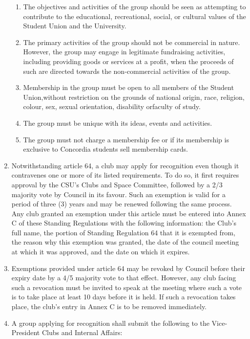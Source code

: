 \documentclass[oneside]{book}
\begin{document}
\begin{enumerate}
\begin{enumerate}
\item The objectives and activities of the group should be seen as attempting
to contribute to the educational, recreational, social, or cultural
values of the Student Union and the University. 
\item The primary activities of the group should not be commercial in nature.
However, the group may engage in legitimate fundraising activities,
including providing goods or services at a profit, when the proceeds
of such are directed towards the non-commercial activities of the
group. 
\item Membership in the group must be open to all members of the Student
Union,without restriction on the grounds of national origin, race,
religion, colour, sex, sexual orientation, disability orfaculty of
study. 
\item The group must be unique with its ideas, events and activities. 
\item The group must not charge a membership fee or if its membership is
exclusive to Concordia students sell membership cards. 
\end{enumerate}
\item Notwithstanding article 64, a club may apply for recognition even though it contravenes 
one or more of its listed requirements. To do so, it first requires approval by the CSU's 
Clubs and Space Committee, followed by a 2/3 majority vote by Council in its favour. 
Such an exemption is valid for a period of three (3) years and may be renewed following 
the same process. Any club granted an exemption under this article must be entered 
into Annex C of these Standing Regulations with the following information: the Club's 
full name, the portion of Standing Regulation 64 that it is exempted from, the reason 
why this exemption was granted, the date of the council meeting at which it was 
approved, and the date on which it expires.
\item Exemptions provided under article 64 may be revoked by Council before their expiry 
date by a 4/5 majority vote to that effect. However, any club facing such a revocation 
must be invited to speak at the meeting where such a vote is to take place at least 10 
days before it is held. If such a revocation takes place, the club's entry in Annex C is to be 
removed immediately.
\item A group applying for recognition shall submit the following to the
Vice-President Clubs and Internal Affairs:


\end{enumerate}
\end{document}
